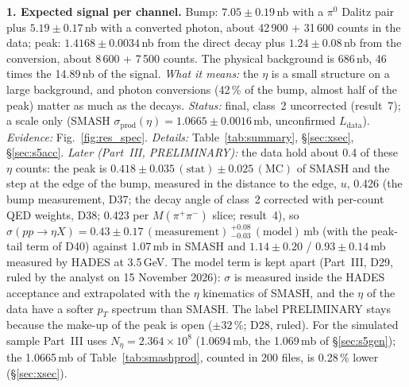 \documentclass[11pt,a4paper]{article}
\newcommand{\piz}{\ensuremath{\pi^{0}}\xspace}
\newcommand{\Mpipi}{\ensuremath{M(\pi^{+}\pi^{-})}\xspace}
\newcommand{\Ldata}{\ensuremath{L_{\mathrm{data}}}\xspace}
\begin{document}
\textbf{1. Expected signal per channel.} Bump: $7.05\pm0.19$\,nb with a \piz Dalitz pair plus $5.19\pm0.17$\,nb with a
converted photon, about 42\,900 + 31\,600 counts in the data; peak: $1.4168\pm0.0034$\,nb from the direct decay plus
$1.24\pm0.08$\,nb from the conversion, about 8\,600 + 7\,500 counts. The physical background is 686\,nb, 46 times the
14.89\,nb of the signal. \emph{What it means:} the $\eta$ is a small structure on a large background, and photon
conversions (42\,\% of the bump, almost half of the peak) matter as much as the decays. \emph{Status:} final, class~2
uncorrected (result~7); a scale only (SMASH $\sigma_{\mathrm{prod}}(\eta) = 1.0665\pm0.0016$\,mb, unconfirmed \Ldata).
\emph{Evidence:} Fig.~\ref{fig:res_spec}. \emph{Details:} Table~\ref{tab:summary}, \S\ref{sec:xsec}, \S\ref{sec:s5acc}.
\emph{Later (Part~III, PRELIMINARY):} the data hold about 0.4 of these $\eta$ counts: the peak is $0.418\pm0.035\,(\mathrm{stat})
\pm0.025\,(\mathrm{MC})$ of SMASH and the step at the edge of the bump, measured in the distance to the edge, $u$, 0.426
(the bump measurement, D37; the decay angle of class~2 corrected with per-count QED weights, D38; 0.423 per \Mpipi slice;
result~4), so
$\sigma(pp\to\eta X)=0.43\pm0.17\,(\mathrm{measurement})\,^{+0.08}_{-0.03}\,(\mathrm{model})$\,mb (with the peak-tail term
of D40) against 1.07\,mb in SMASH
and $1.14\pm0.20$ / $0.93\pm0.14$\,mb measured by HADES at 3.5\,GeV. The model term is kept apart (Part~III, D29, ruled by
the analyst on 15 November 2026): $\sigma$ is measured inside the HADES acceptance and extrapolated with the $\eta$
kinematics of SMASH, and the $\eta$ of the data have a softer $p_T$ spectrum than SMASH. The label PRELIMINARY stays
because the make-up of the peak is open ($\pm32$\,\%; D28, ruled). For the simulated sample Part~III uses $N_\eta=2.364\times10^8$ (1.0694\,mb, the 1.069\,mb of \S\ref{sec:s5gen});
the 1.0665\,mb of Table~\ref{tab:smashprod}, counted in 200 files, is 0.28\,\% lower (\S\ref{sec:xsec}).
\end{document}
